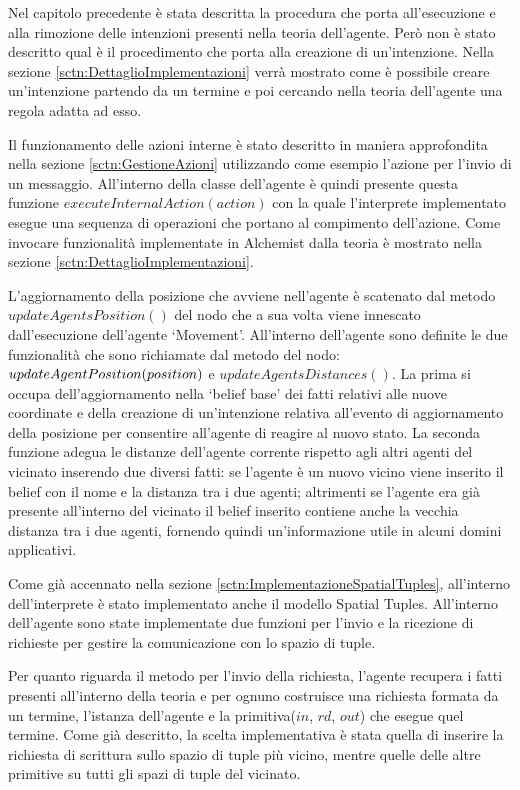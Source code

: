 Nel capitolo precedente è stata descritta la procedura che porta all'esecuzione e alla rimozione delle intenzioni presenti nella teoria dell'agente. Però non è stato descritto qual è il procedimento che porta alla creazione di un'intenzione.
Nella sezione \ref{sctn:DettaglioImplementazioni} verrà mostrato come è possibile creare un'intenzione partendo da un termine e poi cercando nella teoria dell'agente una regola adatta ad esso.

Il funzionamento delle azioni interne è stato descritto in maniera approfondita nella sezione \ref{sctn:GestioneAzioni} utilizzando come esempio l'azione per l'invio di un messaggio. All'interno della classe dell'agente è quindi presente questa funzione $executeInternalAction(action)$ con la quale l'interprete implementato esegue una sequenza di operazioni che portano al compimento dell'azione. Come invocare funzionalità implementate in Alchemist dalla teoria è mostrato nella sezione \ref{sctn:DettaglioImplementazioni}.

L'aggiornamento della posizione che avviene nell'agente è scatenato dal metodo $updateAgentsPosition()$ del nodo che a sua volta viene innescato dall'esecuzione dell'agente `Movement'. All'interno dell'agente sono definite le due funzionalità che sono richiamate dal metodo del nodo: $up\-da\-teA\-ge\-ntPo\-si\-tion(po\-si\-tion)$ e $updateAgentsDistances()$. La prima si occupa dell'aggiornamento nella `belief base' dei fatti relativi alle nuove coordinate e della creazione di un'intenzione relativa all'evento di aggiornamento della posizione per consentire all'agente di reagire al nuovo stato.
La seconda funzione adegua le distanze dell'agente corrente rispetto agli altri agenti del vicinato inserendo due diversi fatti: se l'agente è un nuovo vicino viene inserito il belief con il nome e la distanza tra i due agenti; altrimenti se l'agente era già presente all'interno del vicinato il belief inserito contiene anche la vecchia distanza tra i due agenti, fornendo quindi un'informazione utile in alcuni domini applicativi.

Come già accennato nella sezione \ref{sctn:ImplementazioneSpatialTuples}, all'interno dell'interprete è stato implementato anche il modello Spatial Tuples.
All'interno dell'agente sono state implementate due funzioni per l'invio e la ricezione di richieste per gestire la comunicazione con lo spazio di tuple.

Per quanto riguarda il metodo per l'invio della richiesta, l'agente recupera i fatti presenti all'interno della teoria e per ognuno costruisce una richiesta formata da un termine, l'istanza dell'agente e la primitiva($in$, $rd$, $out$) che esegue quel termine. Come già descritto, la scelta implementativa è stata quella di inserire la richiesta di scrittura sullo spazio di tuple più vicino, mentre quelle delle altre primitive su tutti gli spazi di tuple del vicinato.

